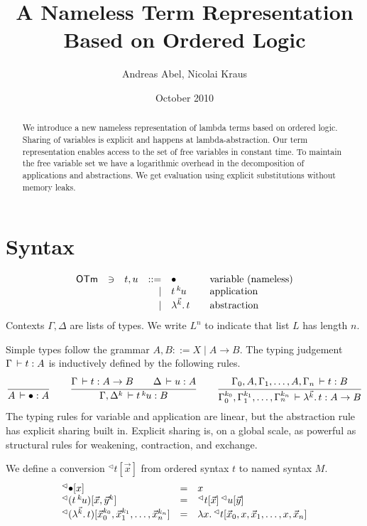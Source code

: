 \documentclass[a4paper]{article}
\title{A Nameless Term Representation Based on Ordered Logic}
\author{Andreas Abel, Nicolai Kraus}
\institute{
  Department of Computer Science \\
  Ludwig-Maximilians-University Munich \\
  \email{andreas.abel@ifi.lmu.de}
}
\date{October 2010}
\newcommand{\OTm}{\mathsf{OTm}}
\newcommand{\oann}[1]{{}^{#1}\kern-0.15ex}
\newcommand{\ovar}{\mathord{\bullet}}
\newcommand{\oapp}[1]{\,\oann{#1}}
\newcommand{\olam}[1]{\lambda^{#1}.\,}
\newcommand{\oprint}[2]{{}^{\lhd}\esubst{#1}{#2}}
\newcommand{\oprintp}[2]{\oprint{(#1)}{#2}}
\renewcommand{\esubst}[2]{#1[#2]}
\begin{document}
\maketitle

\begin{abstract}
  We introduce a new nameless representation of lambda terms based on
  ordered logic.  Sharing of variables is explicit and happens at
  lambda-abstraction.  Our term representation enables access to the
  set of free variables in constant time.  To maintain the free
  variable set we have a logarithmic overhead in the decomposition of
  applications and abstractions.
  We get evaluation using
  explicit substitutions without memory leaks.
\end{abstract}

\section{Syntax}

\[
\begin{array}{lllrl@{\qquad}l}
\OTm & \ni & t,u & ::= & \ovar & \mbox{variable (nameless)} \\
&&& \mid & t \oapp k u & \mbox{application} \\
&&& \mid & \olam {\vec k} t & \mbox{abstraction} \\
\end{array}
\]
Contexts $\Gamma,\Delta$ are lists of types.  We write $L^n$ to
indicate that list $L$ has length $n$.

  Simple types follow the grammar $A, B ::= X
\mid A \to B$. The typing judgement $\Gamma \,\vdash t : A$ is inductively
defined by the following rules.
\begin{gather*}
  \ru{}{A \der \ovar : A}
\qquad
  \ru{\Gamma \der t : A \to B \qquad
      \Delta \der u : A
    }{\Gamma,\Delta^k \der t \oapp k u : B}
\qquad
  \ru{\Gamma_0,A,\Gamma_1,\dots,A,\Gamma_n \der t : B
    }{\Gamma_0^{k_0},\Gamma_1^{k_1},\dots,\Gamma_n^{k_n} \der
        \olam {\vec k} t : A \to B}
\end{gather*}
The typing rules for variable and application are linear, but the
abstraction rule has explicit sharing built in.  Explicit sharing is,
on a global scale, as powerful as structural rules for weakening,
contraction, and exchange.

  We define a conversion $\oprint t {\vec x}$
from ordered syntax $t$ to named syntax $M$.
\[
\begin{array}{lll}
  \oprint \ovar x
    & = & x \\
  \oprintp {t \oapp k u} {\vec x,\vec y^k}
    & = & \oprint t {\vec x} \, \oprint u {\vec y} \\
  \oprintp {\olam {\vec k} t}
    {\vec x_0^{k_0},\vec x_1^{k_1},\dots,\vec x_n^{k_n}}
    & = & \lambda x.\, \oprint t {\vec x_0,x,\vec x_1,\dots,x,\vec x_n} \\
\end{array}
\]
\end{document}
